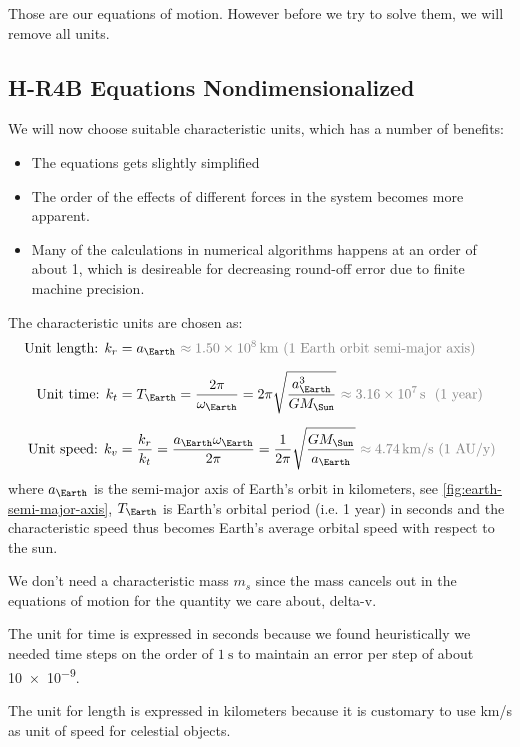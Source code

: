 Those are our equations of motion. However before we try to solve them, we will remove all units.

\subsection{H-R4B Equations Nondimensionalized}
We will now choose suitable characteristic units, which has a number of benefits:
\begin{itemize}
    \item The equations gets slightly simplified
    \item The order of the effects of different forces in the system becomes more apparent.
    \item Many of the calculations in numerical algorithms happens at an order of about 1, which is desireable for decreasing round-off error due to finite machine precision.
\end{itemize}

The characteristic units are chosen as:
\begin{align}
    \text{Unit length: } k_r &= a_{\Earth}\ {\color{gray} \approx \SI{1.50e8}{\km}\ \text{(1 Earth orbit semi-major axis)}}  \\[0.2cm]
    \text{Unit time: } k_t &= T_{\Earth} = \frac{2\pi}{\omega_\Earth} = 2\pi \sqrt{\frac{a_\Earth^3}{G M_\Sun}}\ {\color{gray} \approx \SI{3.16e7}{\s}\ \text{ (1 year)}} \\[0.2cm]
    \text{Unit speed: } k_v &= \frac{k_r}{k_t} = \frac{a_\Earth \omega_\Earth}{2\pi} = \frac{1}{2\pi} \sqrt{\frac{G M_\Sun}{a_\Earth}}\ {\color{gray} \approx \SI{4.74}{\km/\s}\ \text{(1 AU/y)}}
\end{align}
where \(a_\Earth\) is the semi-major axis of Earth's orbit in kilometers, see \cref{fig:earth-semi-major-axis}, \(T_\Earth\) is Earth's orbital period (i.e. 1 year) in seconds and the characteristic speed thus becomes Earth's average orbital speed with respect to the sun.

We don't need a characteristic mass \(m_s\) since the mass cancels out in the equations of motion for the quantity we care about, delta-v.

The unit for time is expressed in seconds because we found heuristically we needed time steps on the order of \(\SI{1}{\s}\) to maintain an error per step of about \num{10e-9}.

The unit for length is expressed in kilometers because it is customary to use \si{\km/\s} as unit of speed for celestial objects.

